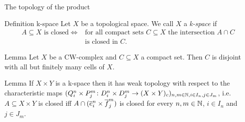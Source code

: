 \documentclass{beamer}
\begin{document}
\begin{frame}{The topology of the product}
\begin{block}{Definition k-space}
  Let $X$ be a topological space. 
  We call $X$ a \emph{k-space} if 
  \begin{align*}
    A \subseteq X \text{ is closed} \iff &\text{for all compact sets } C \subseteq X \text{ the intersection } A \cap C \\
    &\text{is closed in } C.
  \end{align*}
\end{block}
\begin{block}{Lemma}
  Let $X$ be a CW-complex and $C \subseteq X$ a compact set. 
  Then $C$ is disjoint with all but finitely many cells of $X$.
\end{block}
\begin{block}{Lemma}
  If $X \times Y$ is a k-space then it has weak topology with respect to the characteristic maps $(Q_i^n \times P_j^m \colon D_i^n \times D_j^m \to (X \times Y)_c)_{n,m \in \bN,i \in I_n,j \in J_m}$, i.e. $A \subseteq X \times Y$ is closed iff $A \cap (\closedCell{n}{i} \times \closedCellf{m}{j})$ is closed for every $n, m \in \bN$, $i \in I_n$ and $j \in J_m$.
\end{block}
\end{frame}
\end{document}
